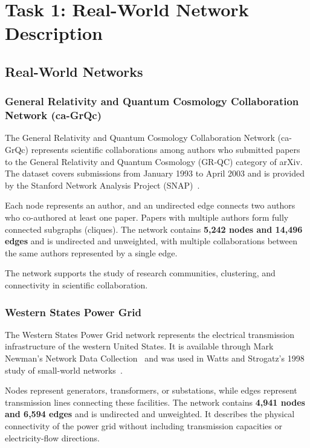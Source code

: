\section{Task 1: Real-World Network Description}
\subsection{Real-World Networks}

\subsubsection{General Relativity and Quantum Cosmology Collaboration Network (ca-GrQc)}

The General Relativity and Quantum Cosmology Collaboration Network (ca-GrQc) represents scientific collaborations among authors who submitted papers to the General Relativity and Quantum Cosmology (GR-QC) category of arXiv. The dataset covers submissions from January 1993 to April 2003 and is provided by the Stanford Network Analysis Project (SNAP)~\cite{snap-ca-grqc}.

Each node represents an author, and an undirected edge connects two authors who co-authored at least one paper. Papers with multiple authors form fully connected subgraphs (cliques). The network contains \textbf{5,242 nodes and 14,496 edges} and is undirected and unweighted, with multiple collaborations between the same authors represented by a single edge.

The network supports the study of research communities, clustering, and connectivity in scientific collaboration.

\subsubsection{Western States Power Grid}

The Western States Power Grid network represents the electrical transmission infrastructure of the western United States. It is available through Mark Newman's Network Data Collection~\cite{newman-power-grid} and was used in Watts and Strogatz's 1998 study of small-world networks~\cite{watts1998smallworld}.

Nodes represent generators, transformers, or substations, while edges represent transmission lines connecting these facilities. The network contains \textbf{4,941 nodes and 6,594 edges} and is undirected and unweighted. It describes the physical connectivity of the power grid without including transmission capacities or electricity-flow directions.

